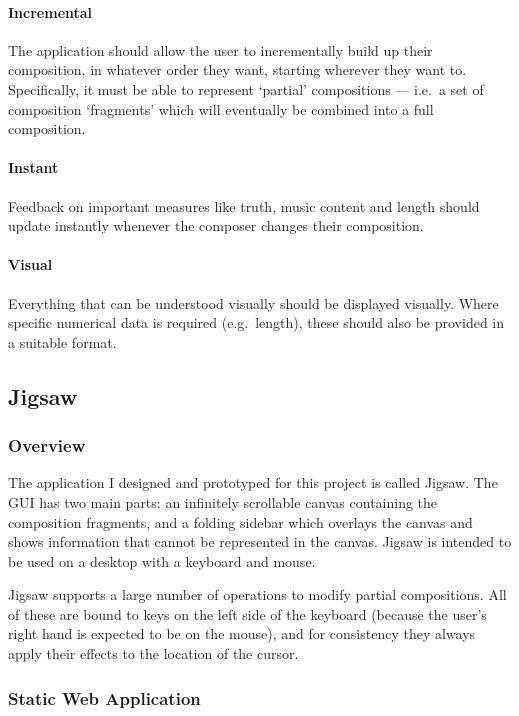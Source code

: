 \documentclass[12pt]{article}
\begin{document}
\paragraph{Incremental} The application should allow the user to incrementally build up their
composition, in whatever order they want, starting wherever they want to.  Specifically, it must
be able to represent `partial' compositions --- i.e.\ a set of composition `fragments' which will
eventually be combined into a full composition.

\paragraph{Instant} Feedback on important measures like truth, music content and length should
update instantly whenever the composer changes their composition.  

\paragraph{Visual} Everything that can be understood visually should be displayed visually.  Where
specific numerical data is required (e.g.\ length), these should also be provided in a suitable
format.

\subsection{Jigsaw}

\subsubsection{Overview}

The application I designed and prototyped for this project is called Jigsaw.  The GUI has two main
parts: an infinitely scrollable canvas containing the composition fragments, and a folding sidebar
which overlays the canvas and shows information that cannot be represented in the canvas.  Jigsaw is
intended to be used on a desktop with a keyboard and mouse.

Jigsaw supports a large number of operations to modify partial compositions.  All of these are bound
to keys on the left side of the keyboard (because the user's right hand is expected to be on the
mouse), and for consistency they always apply their effects to the location of the cursor.

\subsubsection{Static Web Application}
\end{document}
